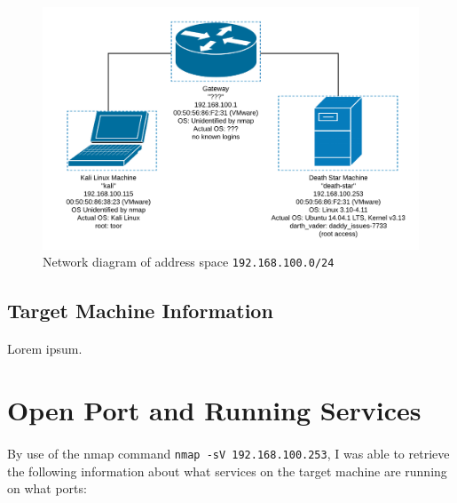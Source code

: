 \documentclass{article}
\begin{document}
\begin{figure}[h!]
	\includegraphics[width=\linewidth]{resources/network-diagram.png}
	\caption{Network diagram of address space \texttt{192.168.100.0/24}}
	\label{fig:network-diagram}
\end{figure}

\subsection{Target Machine Information}
\paragraph{}
Lorem ipsum.

\newpage

\section{Open Port and Running Services}
\paragraph{}
By use of the nmap command \texttt{nmap -sV 192.168.100.253}, I was able to retrieve the following information about what services on the target machine are running on what ports:
\newline
\newline
\end{document}
